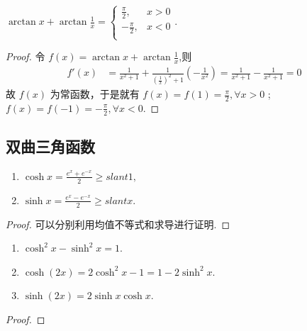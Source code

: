 \documentclass[../../main.tex]{subfiles}
\begin{document}
\begin{proposition}\label{proposition:arctan相关等式}
$\arctan x+\arctan \frac{1}{x}=\begin{cases}
\frac{\pi}{2},&x>0\\
-\frac{\pi}{2},&x<0\\
\end{cases}$.
\end{proposition}
\begin{proof}
令 \( f(x)=\arctan x+\arctan\frac{1}{x} \),则
\begin{align*}
f'(x)&=\frac{1}{x^2 + 1}+\frac{1}{(\frac{1}{x})^2 + 1}(-\frac{1}{x^2})=\frac{1}{x^2 + 1}-\frac{1}{x^2 + 1}=0
\end{align*}
故 \( f(x) \) 为常函数，于是就有 \( f(x)=f(1)=\frac{\pi}{2},\forall x>0 \) ;\( f(x)=f(-1)=-\frac{\pi}{2},\forall x<0 \).
\end{proof}


\subsection{双曲三角函数}

\begin{proposition}
\begin{enumerate}[(1)]
\item $\cosh x=\frac{e^{x}+e^{-x}}{2}\geqslant slant1,$

\item $\sinh x=\frac{e^{x}-e^{-x}}{2}\geqslant slant x.$
\end{enumerate}
\end{proposition}
\begin{proof}
可以分别利用均值不等式和求导进行证明. 
\end{proof}

\begin{proposition}
\begin{enumerate}
\item $\cosh^2 x-\sinh^2 x=1$.

\item $\cosh(2x)=2\cosh^2 x-1=1-2\sinh^2 x$.

\item $\sinh(2x)=2\sinh x\cosh x$. 
\end{enumerate}
\end{proposition}
\begin{proof}

\end{proof}
\end{document}
